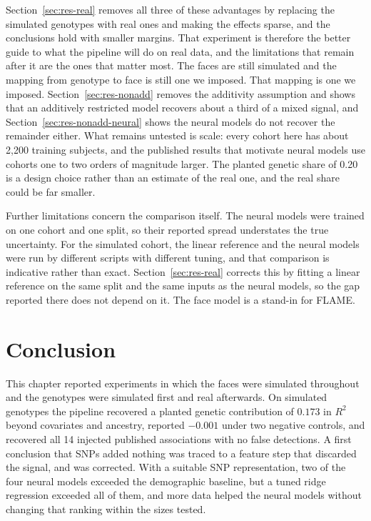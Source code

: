 Section~\ref{sec:res-real} removes all three of these advantages by replacing the simulated genotypes with real ones and making the effects sparse, and the conclusions hold with smaller margins. That experiment is therefore the better guide to what the pipeline will do on real data, and the limitations that remain after it are the ones that matter most. The faces are still simulated and the mapping from genotype to face is still one we imposed. That mapping is one we imposed. Section~\ref{sec:res-nonadd} removes the additivity assumption and shows that an additively restricted model recovers about a third of a mixed signal, and Section~\ref{sec:res-nonadd-neural} shows the neural models do not recover the remainder either. What remains untested is scale: every cohort here has about 2,200 training subjects, and the published results that motivate neural models use cohorts one to two orders of magnitude larger. The planted genetic share of 0.20 is a design choice rather than an estimate of the real one, and the real share could be far smaller.

Further limitations concern the comparison itself. The neural models were trained on one cohort and one split, so their reported spread understates the true uncertainty. For the simulated cohort, the linear reference and the neural models were run by different scripts with different tuning, and that comparison is indicative rather than exact. Section~\ref{sec:res-real} corrects this by fitting a linear reference on the same split and the same inputs as the neural models, so the gap reported there does not depend on it. The face model is a stand-in for FLAME.

\section{Conclusion}
This chapter reported experiments in which the faces were simulated throughout and the genotypes were simulated first and real afterwards. On simulated genotypes the pipeline recovered a planted genetic contribution of $0.173$ in $R^2$ beyond covariates and ancestry, reported $-0.001$ under two negative controls, and recovered all 14 injected published associations with no false detections. A first conclusion that SNPs added nothing was traced to a feature step that discarded the signal, and was corrected. With a suitable SNP representation, two of the four neural models exceeded the demographic baseline, but a tuned ridge regression exceeded all of them, and more data helped the neural models without changing that ranking within the sizes tested.

